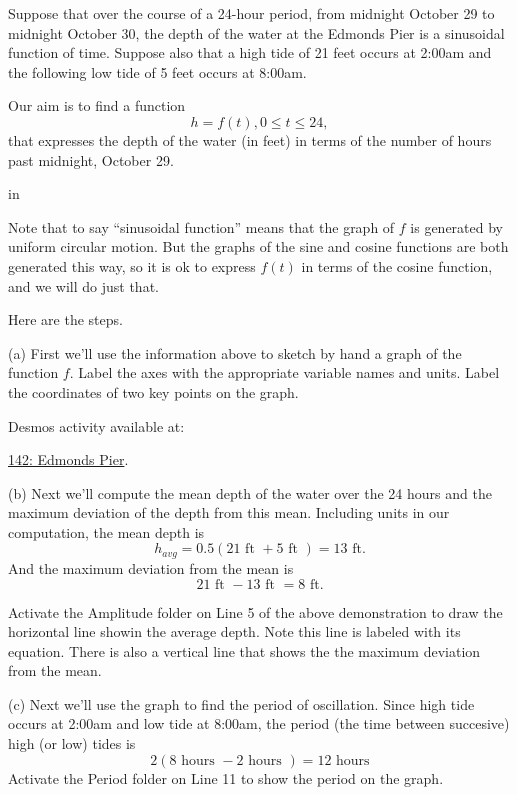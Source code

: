 \documentclass{ximera}
\newcommand{\pskip}{\vskip 0.1 in}
\begin{document}
\begin{example} \label{Efdgu7u67}
Suppose that over the course of a 24-hour period, from midnight October 29 to midnight October 30, the depth of the water at the Edmonds Pier is a sinusoidal function of time. Suppose also that a high tide of 21 feet occurs at 2:00am and the following low tide of 5 feet occurs at 8:00am. 


\begin{explanation}
Our aim is to find a function
\[
    h = f(t) , 0\leq t \leq 24, 
\]
that expresses the depth of the water (in feet) in terms of the number of hours past midnight, October 29. 

\pskip

Note that to say ``sinusoidal function'' means that the graph of $f$ is generated by uniform circular motion. But the graphs of the sine and cosine functions are both generated this way, so it is ok to express $f(t)$ in terms of the cosine function, and we will do just that.

Here are the steps.


(a) First we'll use the information above to sketch by hand a graph of the function $f$. Label the axes with the appropriate variable names and units. Label the coordinates of two key points on the graph.

Desmos activity available at:

\href{https://www.desmos.com/calculator/x2kocpkcfm}{142: Edmonds Pier}.

 
\begin{onlineOnly}
    \begin{center}
\end{center}
\end{onlineOnly}



(b) Next we'll compute the mean depth of the water over the 24 hours and the maximum deviation of the depth from this mean. Including units in our computation, the mean depth is 
\[
    h_{avg} = 0.5 ( 21 \text{ ft } + 5 \text{ ft }) = 13 \text{ ft} . 
\]
And the maximum deviation from the mean is
\[
     21 \text{ ft } - 13 \text{ ft } = 8 \text{ ft}.
\]

Activate the Amplitude folder on Line 5 of the above demonstration to draw the horizontal line showin the average depth. Note this line is labeled with its equation. There is also a vertical line that shows the the maximum deviation from the mean.

(c) Next we'll use the graph to find the period of oscillation. Since high tide occurs at 2:00am and low tide at 8:00am, the period (the time between succesive) high (or low) tides is
\[
    2(8 \text{ hours } - 2 \text{ hours }) = 12 \text{ hours}
\]
Activate the Period folder on Line 11 to show the period on the graph.


\end{explanation}
\end{example}
\end{document}
